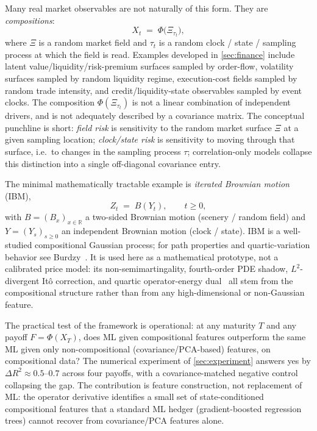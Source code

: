 \documentclass[11pt,reqno]{amsart}
\theoremstyle{plain}
\theoremstyle{definition}
\theoremstyle{remark}
\newcommand{\R}{\mathbb R}
\newcommand{\IBM}{Z}
\newcommand{\Bvar}{B}
\newcommand{\Yclock}{Y}
\begin{document}
Many real market observables are not naturally of this form.
They are \emph{compositions}:
\begin{equation}\label{eq:comp-model}
  X_{t}\;=\;\Phi\bigl(\Xi_{\tau_{t}}\bigr),
\end{equation}
where $\Xi$ is a random market field and $\tau_{t}$ is a random
clock / state / sampling process at which the field is read.
Examples developed in \cref{sec:finance} include latent
value/liquidity/risk-premium surfaces sampled by order-flow,
volatility surfaces sampled by random liquidity regime,
execution-cost fields sampled by random trade intensity, and
credit/liquidity-state observables sampled by event clocks. The
composition $\Phi(\Xi_{\tau_{t}})$ is not a linear combination
of independent drivers, and is not adequately described by a
covariance matrix. The conceptual punchline is short:
\emph{field risk} is sensitivity to the random market surface
$\Xi$ at a given sampling location; \emph{clock/state risk} is
sensitivity to moving through that surface, i.e.\ to changes in
the sampling process $\tau$; correlation-only models collapse
this distinction into a single off-diagonal covariance entry.

The minimal mathematically tractable example is \emph{iterated
Brownian motion} (IBM),
\begin{equation}\label{eq:IBM}
  \IBM_{t}\;=\;\Bvar(\Yclock_{t}),\qquad t\ge 0,
\end{equation}
with $\Bvar=(\Bvar_{x})_{x\in\R}$ a two-sided Brownian motion
(scenery / random field) and $\Yclock=(\Yclock_{s})_{s\ge 0}$ an
independent Brownian motion (clock / state). IBM is a
well-studied compositional Gaussian process; for path properties
and quartic-variation behavior see Burdzy~\cite{Burdzy}. It is
used here as a mathematical prototype, not a calibrated price
model: its non-semimartingality, fourth-order PDE shadow,
$L^{2}$-divergent It\^o correction, and quartic operator-energy
dual~\cite{EnergyFirst,FCDC,BidegreeAtlas} all stem from the
compositional structure rather than from any high-dimensional
or non-Gaussian feature.

The practical test of the framework is operational: at any
maturity $T$ and any payoff $F=\Phi(X_{T})$, does ML given
compositional features outperform the same ML given only
non-compositional (covariance/PCA-based) features, on
compositional data? The numerical experiment of
\cref{sec:experiment} answers yes by
$\Delta R^{2}\approx 0.5$--$0.7$ across four payoffs, with a
covariance-matched negative control collapsing the gap. The
contribution is feature construction, not replacement of ML:
the operator derivative identifies a small set of
state-conditioned compositional features that a standard ML
hedger (gradient-boosted regression trees) cannot recover from
covariance/PCA features alone.
\end{document}
